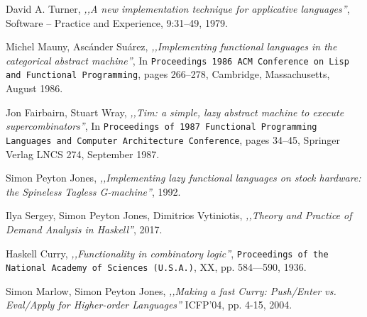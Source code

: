 \documentclass[en]{pracamgr}
\begin{document}
\begin{thebibliography}{99}
 David A. Turner, \textit{,,A new implementation technique for applicative languages''}, Software -- Practice and Experience, 9:31–49, 1979.

 Michel Mauny, Asc\'ander Su\'arez, \textit{,,Implementing functional languages in the categorical abstract machine''}, In \texttt{Proceedings 1986 ACM Conference on Lisp and Functional Programming}, pages 266–278, Cambridge, Massachusetts, August 1986.

 Jon Fairbairn, Stuart Wray, \textit{,,Tim: a simple, lazy abstract machine to execute supercombinators''},  In \texttt{Proceedings of 1987 Functional Programming Languages and Computer Architecture Conference}, pages 34–45, Springer Verlag LNCS 274, September 1987.

 Simon Peyton Jones, \textit{,,Implementing lazy functional languages on stock hardware: the Spineless Tagless G-machine''}, 1992.

 Ilya Sergey, Simon Peyton Jones, Dimitrios Vytiniotis, \textit{,,Theory and Practice of Demand Analysis in Haskell''}, 2017.

 Haskell Curry, \textit{,,Functionality in combinatory logic''}, \texttt{Proceedings
of the National Academy of Sciences (U.S.A.)}, XX, pp. 584—590, 1936.

 Simon Marlow, Simon Peyton Jones, \textit{,,Making a fast Curry: Push/Enter vs. Eval/Apply for Higher-order Languages''} ICFP'04, pp. 4-15, 2004.

\end{thebibliography}
\end{document}

